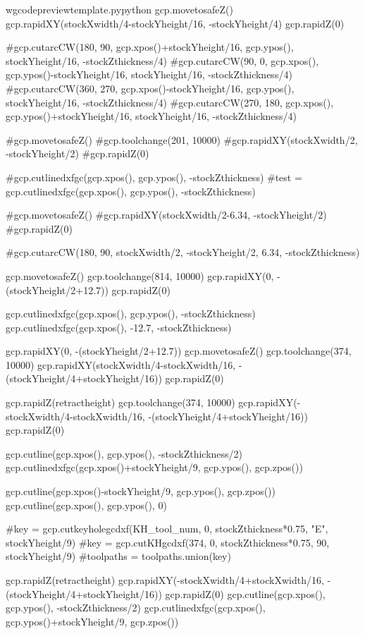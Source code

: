\documentclass{ltxdoc}
\begin{document}
\begin{writecode}{w}{gcodepreviewtemplate.py}{python}
gcp.movetosafeZ()
gcp.rapidXY(stockXwidth/4-stockYheight/16, -stockYheight/4)
gcp.rapidZ(0)


#gcp.cutarcCW(180, 90, gcp.xpos()+stockYheight/16, gcp.ypos(), stockYheight/16, -stockZthickness/4)
#gcp.cutarcCW(90, 0, gcp.xpos(), gcp.ypos()-stockYheight/16, stockYheight/16, -stockZthickness/4)
#gcp.cutarcCW(360, 270, gcp.xpos()-stockYheight/16, gcp.ypos(), stockYheight/16, -stockZthickness/4)
#gcp.cutarcCW(270, 180, gcp.xpos(), gcp.ypos()+stockYheight/16, stockYheight/16, -stockZthickness/4)

#gcp.movetosafeZ()
#gcp.toolchange(201, 10000)
#gcp.rapidXY(stockXwidth/2, -stockYheight/2)
#gcp.rapidZ(0)

#gcp.cutlinedxfgc(gcp.xpos(), gcp.ypos(), -stockZthickness)
#test = gcp.cutlinedxfgc(gcp.xpos(), gcp.ypos(), -stockZthickness)

#gcp.movetosafeZ()
#gcp.rapidXY(stockXwidth/2-6.34, -stockYheight/2)
#gcp.rapidZ(0)

#gcp.cutarcCW(180, 90, stockXwidth/2, -stockYheight/2, 6.34, -stockZthickness)


gcp.movetosafeZ()
gcp.toolchange(814, 10000)
gcp.rapidXY(0, -(stockYheight/2+12.7))
gcp.rapidZ(0)

gcp.cutlinedxfgc(gcp.xpos(), gcp.ypos(), -stockZthickness)
gcp.cutlinedxfgc(gcp.xpos(), -12.7, -stockZthickness)

gcp.rapidXY(0, -(stockYheight/2+12.7))
gcp.movetosafeZ()
gcp.toolchange(374, 10000)
gcp.rapidXY(stockXwidth/4-stockXwidth/16, -(stockYheight/4+stockYheight/16))
gcp.rapidZ(0)

gcp.rapidZ(retractheight)
gcp.toolchange(374, 10000)
gcp.rapidXY(-stockXwidth/4-stockXwidth/16, -(stockYheight/4+stockYheight/16))
gcp.rapidZ(0)

gcp.cutline(gcp.xpos(), gcp.ypos(), -stockZthickness/2)
gcp.cutlinedxfgc(gcp.xpos()+stockYheight/9, gcp.ypos(), gcp.zpos())

gcp.cutline(gcp.xpos()-stockYheight/9, gcp.ypos(), gcp.zpos())
gcp.cutline(gcp.xpos(), gcp.ypos(), 0)

#key = gcp.cutkeyholegcdxf(KH_tool_num, 0, stockZthickness*0.75, "E", stockYheight/9)
#key = gcp.cutKHgcdxf(374, 0, stockZthickness*0.75, 90, stockYheight/9)
#toolpaths = toolpaths.union(key)

gcp.rapidZ(retractheight)
gcp.rapidXY(-stockXwidth/4+stockXwidth/16, -(stockYheight/4+stockYheight/16))
gcp.rapidZ(0)
gcp.cutline(gcp.xpos(), gcp.ypos(), -stockZthickness/2)
gcp.cutlinedxfgc(gcp.xpos(), gcp.ypos()+stockYheight/9, gcp.zpos())


\end{writecode}
\end{document}
